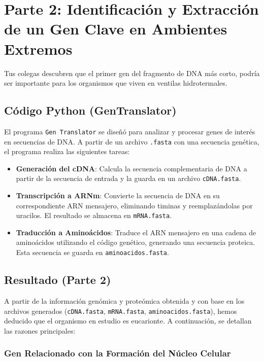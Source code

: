\section*{Parte 2: Identificación y Extracción de un Gen Clave en Ambientes Extremos} 
\label{sec:parte2} %

Tus colegas descubren que el primer gen del fragmento de DNA más corto, podría ser importante para los organismos que viven en ventilas hidrotermales.

\subsection*{Código Python (GenTranslator)}

El programa \texttt{Gen Translator} se diseñó para analizar y procesar genes de interés en secuencias de DNA. A partir de un archivo \texttt{.fasta} con una secuencia genética, el programa realiza las siguientes tareas:

\begin{itemize}
    \item \textbf{Generación del cDNA}: Calcula la secuencia complementaria de DNA a partir de la secuencia de entrada y la guarda en un archivo \texttt{cDNA.fasta}.
    \item \textbf{Transcripción a ARNm}: Convierte la secuencia de DNA en su correspondiente ARN mensajero, eliminando timinas y reemplazándolas por uracilos. El resultado se almacena en \texttt{mRNA.fasta}.
    \item \textbf{Traducción a Aminoácidos}: Traduce el ARN mensajero en una cadena de aminoácidos utilizando el código genético, generando una secuencia proteica. Esta secuencia se guarda en \texttt{aminoacidos.fasta}.
\end{itemize}

\subsection*{Resultado (Parte 2)}

A partir de la información genómica y proteómica obtenida y con base en los archivos generados (\texttt{cDNA.fasta}, \texttt{mRNA.fasta}, \texttt{aminoacidos.fasta}), hemos deducido que el organismo en estudio es eucarionte. A continuación, se detallan las razones principales:

\subsubsection*{Gen Relacionado con la Formación del Núcleo Celular}

